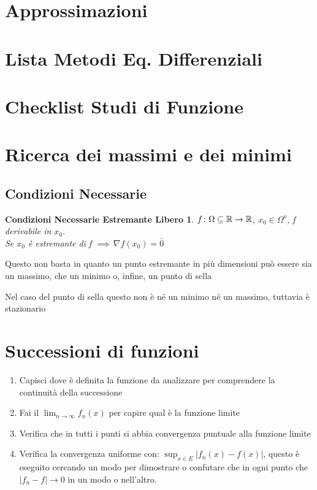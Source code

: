 \documentclass[a4paper]{article}
\newcommand{\numberset}{\mathbb}
\newcommand{\R}{\numberset{R}}
\begin{document}
\section{Approssimazioni}

\section{Lista Metodi Eq. Differenziali}

\section{Checklist Studi di Funzione}

\section {Ricerca dei massimi e dei minimi}
    \subsection{Condizioni Necessarie}
        \newtheorem{nec}{Condizioni Necessarie Estremante Libero}
        \begin{nec}    
        $\\f\colon\Omega\subseteq\R\to\R$, $ x_0\in\Omega^o$, f derivabile in $x_0$.\\
        Se $x_0$ è estremante di f $\implies \, \nabla f(x_0)=\bar{0}$ 
        \end{nec}
        Questo non basta in quanto un punto estremante in più dimensioni può essere sia un massimo, che un minimo o, infine, un punto di sella 

        Nel caso del punto di sella questo non è né un minimo né un massimo, tuttavia è stazionario 

\section{Successioni di funzioni}
\begin{enumerate}
    \item Capisci dove è definita la funzione da analizzare per comprendere la continuità della successione
    \item Fai il $\lim_{n \to \infty} f_n(x)$ per capire qual è la funzione limite
    \item Verifica che in tutti i punti si abbia convergenza puntuale alla funzione limite
    \item Verifica la convergenza uniforme con: $\sup_{x\in E}|f_n(x)-f(x)|$, questo è eseguito cercando un modo per dimostrare o confutare che in ogni punto che $|f_n-f| \to 0$ in un modo o nell'altro. 
\end{enumerate}
\end{document}
